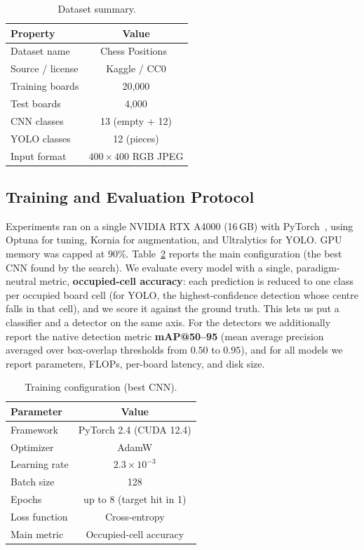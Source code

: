 \documentclass[10pt,twocolumn,a4paper]{article}
\begin{document}
	\begin{table}[h]
		\centering
		\caption{Dataset summary.}
		\label{tab:dataset}
		\begin{tabular}{|l|c|}
			\hline
			\textbf{Property} & \textbf{Value} \\
			\hline
			Dataset name & Chess Positions~\cite{koryakin2019chess} \\
			Source / license & Kaggle / CC0 \\
			Training boards & 20{,}000 \\
			Test boards & 4{,}000 \\
			CNN classes & 13 (empty + 12) \\
			YOLO classes & 12 (pieces) \\
			Input format & $400\times400$ RGB JPEG \\
			\hline
		\end{tabular}
	\end{table}

	\subsection{Training and Evaluation Protocol}

	Experiments ran on a single NVIDIA RTX A4000 (16\,GB) with PyTorch~\cite{paszke2019pytorch}, using Optuna for tuning, Kornia for augmentation, and Ultralytics for YOLO. GPU memory was capped at $90\%$. Table~\ref{tab:training} reports the main configuration (the best CNN found by the search). We evaluate every model with a single, paradigm-neutral metric, \textbf{occupied-cell accuracy}: each prediction is reduced to one class per occupied board cell (for YOLO, the highest-confidence detection whose centre falls in that cell), and we score it against the ground truth. This lets us put a classifier and a detector on the same axis. For the detectors we additionally report the native detection metric \textbf{mAP@50--95} (mean average precision averaged over box-overlap thresholds from $0.50$ to $0.95$), and for all models we report parameters, FLOPs, per-board latency, and disk size.

	\begin{table}[h]
		\centering
		\caption{Training configuration (best CNN).}
		\label{tab:training}
		\begin{tabular}{|l|c|}
			\hline
			\textbf{Parameter} & \textbf{Value} \\
			\hline
			Framework & PyTorch 2.4 (CUDA 12.4) \\
			Optimizer & AdamW \\
			Learning rate & $2.3\times10^{-3}$ \\
			Batch size & 128 \\
			Epochs & up to 8 (target hit in 1) \\
			Loss function & Cross-entropy \\
			Main metric & Occupied-cell accuracy \\
			\hline
		\end{tabular}
	\end{table}
\end{document}
